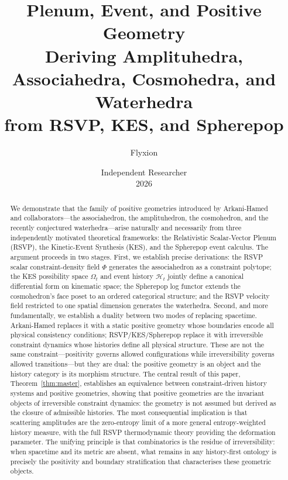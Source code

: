 \documentclass[12pt, oneside]{amsart}
\title{\textbf{Plenum, Event, and Positive Geometry}\\[0.6em]
\large Deriving Amplituhedra, Associahedra, Cosmohedra, and Waterhedra\\
from RSVP, KES, and Spherepop}
\author{Flyxion}
\date{Independent Researcher\\[0.3em] 2026}
\theoremstyle{plain}
\theoremstyle{definition}
\theoremstyle{remark}
\newcommand{\Phif}{\Phi}
\newcommand{\OmKS}{\Omega}
\newcommand{\HKS}{\mathcal{H}}
\begin{document}

\maketitle
\thispagestyle{empty}

\begin{abstract}
We demonstrate that the family of positive geometries introduced by Arkani-Hamed and collaborators---the associahedron, the amplituhedron, the cosmohedron, and the recently conjectured waterhedra---arise naturally and necessarily from three independently motivated theoretical frameworks: the Relativistic Scalar-Vector Plenum (RSVP), the Kinetic-Event Synthesis (KES), and the Spherepop event calculus. The argument proceeds in two stages. First, we establish precise derivations: the RSVP scalar constraint-density field $\Phif$ generates the associahedron as a constraint polytope; the KES possibility space $\OmKS_t$ and event history $\HKS_t$ jointly define a canonical differential form on kinematic space; the Spherepop log functor extends the cosmohedron's face poset to an ordered categorical structure; and the RSVP velocity field restricted to one spatial dimension generates the waterhedra. Second, and more fundamentally, we establish a duality between two modes of replacing spacetime. Arkani-Hamed replaces it with a static positive geometry whose boundaries encode all physical consistency conditions; RSVP/KES/Spherepop replace it with irreversible constraint dynamics whose histories define all physical structure. These are not the same constraint---positivity governs allowed configurations while irreversibility governs allowed transitions---but they are dual: the positive geometry is an object and the history category is its morphism structure. The central result of this paper, Theorem~\ref{thm:master}, establishes an equivalence between constraint-driven history systems and positive geometries, showing that positive geometries are the invariant objects of irreversible constraint dynamics: the geometry is not assumed but derived as the closure of admissible histories. The most consequential implication is that scattering amplitudes are the zero-entropy limit of a more general entropy-weighted history measure, with the full RSVP thermodynamic theory providing the deformation parameter. The unifying principle is that combinatorics is the residue of irreversibility: when spacetime and its metric are absent, what remains in any history-first ontology is precisely the positivity and boundary stratification that characterises these geometric objects.
\end{abstract}
\end{document}
